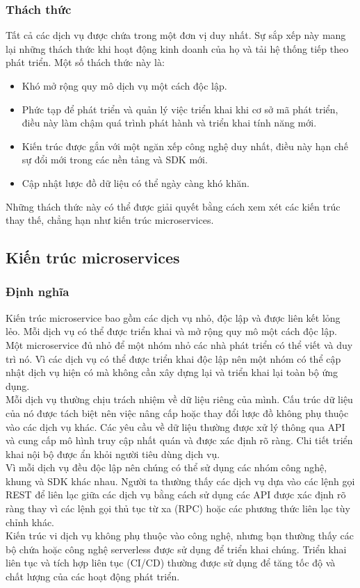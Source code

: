 \subsubsection{Thách thức}
Tất cả các dịch vụ được chứa trong một đơn vị duy nhất. Sự sắp xếp này mang lại những thách thức khi hoạt động kinh doanh của họ và tải hệ thống tiếp theo phát triển. Một số thách thức này là:
\begin{itemize}
    \item Khó mở rộng quy mô dịch vụ một cách độc lập.
    \item Phức tạp để phát triển và quản lý việc triển khai khi cơ sở mã phát triển, điều này làm chậm quá trình phát hành và triển khai tính năng mới.
    \item Kiến trúc được gắn với một ngăn xếp công nghệ duy nhất, điều này hạn chế sự đổi mới trong các nền tảng và SDK mới.
    \item Cập nhật lược đồ dữ liệu có thể ngày càng khó khăn.
\end{itemize}
Những thách thức này có thể được giải quyết bằng cách xem xét các kiến trúc thay thế, chẳng hạn như kiến trúc microservices.

\subsection{Kiến trúc microservices}
\subsubsection{Định nghĩa}
Kiến trúc microservice bao gồm các dịch vụ nhỏ, độc lập và được liên kết lỏng lẻo. Mỗi dịch vụ có thể được triển khai và mở rộng quy mô một cách độc lập.\\[0.5cm]
Một microservice đủ nhỏ để một nhóm nhỏ các nhà phát triển có thể viết và duy trì nó. Vì các dịch vụ có thể được triển khai độc lập nên một nhóm có thể cập nhật dịch vụ hiện có mà không cần xây dựng lại và triển khai lại toàn bộ ứng dụng.\\[0.5cm]
Mỗi dịch vụ thường chịu trách nhiệm về dữ liệu riêng của mình. Cấu trúc dữ liệu của nó được tách biệt nên việc nâng cấp hoặc thay đổi lược đồ không phụ thuộc vào các dịch vụ khác. Các yêu cầu về dữ liệu thường được xử lý thông qua API và cung cấp mô hình truy cập nhất quán và được xác định rõ ràng. Chi tiết triển khai nội bộ được ẩn khỏi người tiêu dùng dịch vụ.\\[0.5cm]
Vì mỗi dịch vụ đều độc lập nên chúng có thể sử dụng các nhóm công nghệ, khung và SDK khác nhau. Người ta thường thấy các dịch vụ dựa vào các lệnh gọi REST để liên lạc giữa các dịch vụ bằng cách sử dụng các API được xác định rõ ràng thay vì các lệnh gọi thủ tục từ xa (RPC) hoặc các phương thức liên lạc tùy chỉnh khác.\\[0.5cm]
Kiến trúc vi dịch vụ không phụ thuộc vào công nghệ, nhưng bạn thường thấy các bộ chứa hoặc công nghệ serverless được sử dụng để triển khai chúng. Triển khai liên tục và tích hợp liên tục (CI/CD) thường được sử dụng để tăng tốc độ và chất lượng của các hoạt động phát triển.
